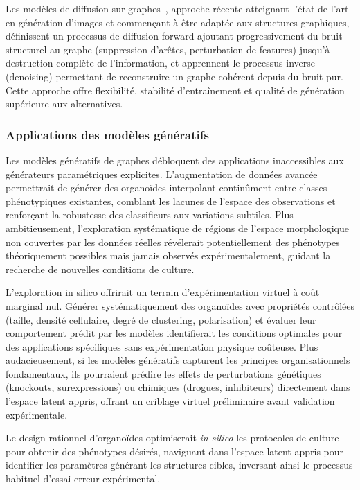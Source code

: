 Les modèles de diffusion sur graphes~\cite{Niu2020,Jo2022,Vignac2023}, approche récente atteignant l'état de l'art en génération d'images et commençant à être adaptée aux structures graphiques, définissent un processus de diffusion forward ajoutant progressivement du bruit structurel au graphe (suppression d'arêtes, perturbation de features) jusqu'à destruction complète de l'information, et apprennent le processus inverse (denoising) permettant de reconstruire un graphe cohérent depuis du bruit pur. Cette approche offre flexibilité, stabilité d'entraînement et qualité de génération supérieure aux alternatives.

\subsubsection{Applications des modèles génératifs}

Les modèles génératifs de graphes débloquent des applications inaccessibles aux générateurs paramétriques explicites. L'augmentation de données avancée permettrait de générer des organoïdes interpolant continûment entre classes phénotypiques existantes, comblant les lacunes de l'espace des observations et renforçant la robustesse des classifieurs aux variations subtiles. Plus ambitieusement, l'exploration systématique de régions de l'espace morphologique non couvertes par les données réelles révélerait potentiellement des phénotypes théoriquement possibles mais jamais observés expérimentalement, guidant la recherche de nouvelles conditions de culture.

L'exploration in silico offrirait un terrain d'expérimentation virtuel à coût marginal nul. Générer systématiquement des organoïdes avec propriétés contrôlées (taille, densité cellulaire, degré de clustering, polarisation) et évaluer leur comportement prédit par les modèles identifierait les conditions optimales pour des applications spécifiques sans expérimentation physique coûteuse. Plus audacieusement, si les modèles génératifs capturent les principes organisationnels fondamentaux, ils pourraient prédire les effets de perturbations génétiques (knockouts, surexpressions) ou chimiques (drogues, inhibiteurs) directement dans l'espace latent appris, offrant un criblage virtuel préliminaire avant validation expérimentale.

Le design rationnel d'organoïdes optimiserait \textit{in silico} les protocoles de culture pour obtenir des phénotypes désirés, naviguant dans l'espace latent appris pour identifier les paramètres générant les structures cibles, inversant ainsi le processus habituel d'essai-erreur expérimental.

